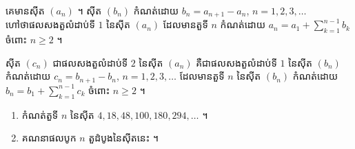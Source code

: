 \begin{formulaBox}[ជាទូទៅ]
គេមានស៊ីត $(a_n)$ ។ ស៊ីត $(b_n)$ កំណត់ដោយ $b_n = a_{n+1} - a_n$, $n = 1, 2, 3, \ldots$ ហៅថាផលសងតួលំដាប់ទី $1$ នៃស៊ីត $(a_n)$ ដែលមានតួទី $n$ កំណត់ដោយ $a_n = a_1 + \displaystyle\sum_{k=1}^{n-1} b_k$ ចំពោះ $n \ge 2$ ។

ស៊ីត $(c_n)$ ជាផលសងតួលំដាប់ទី $2$ នៃស៊ីត $(a_n)$ គឺជាផលសងតួលំដាប់ទី $1$ នៃស៊ីត $(b_n)$ កំណត់ដោយ $c_n = b_{n+1} - b_n$, $n = 1, 2, 3, \ldots$ ដែលមានតួទី $n$ នៃស៊ីត $(b_n)$ កំណត់ដោយ $b_n = b_1 + \displaystyle\sum_{k=1}^{n-1} c_k$ ចំពោះ $n \ge 2$ ។
\end{formulaBox}

\begin{example}[លំហាត់គំរូ]
\begin{enumerate}[a]
  \item កំណត់តួទី $n$ នៃស៊ីត $4, 18, 48, 100, 180, 294, \ldots$ ។
  \item គណនាផលបូក $n$ តួដំបូងនៃស៊ីតនេះ ។
\end{enumerate}
\end{example}
\ans
